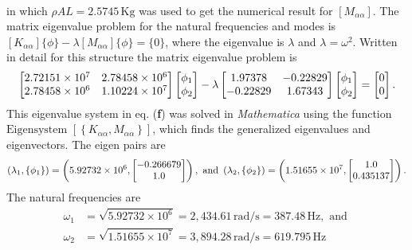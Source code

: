 \documentclass{AeroStructure-ERJohnson}
\begin{document}
\begin{example}
\begin{align}
\end{align}
in which $\rho A L=2.5745\,\mathrm{Kg}$ was used to get the numerical result for $\left[M_{\alpha \alpha}\right]$. The matrix eigenvalue problem for the natural frequencies and modes is $\left[K_{\alpha \alpha}\right]\{\phi\}-\lambda\left[M_{\alpha \alpha}\right]\{\phi\}=\{0\}$, where the eigenvalue is $\lambda$ and $\lambda=\omega^{2}$. Written in detail for this structure the matrix eigenvalue problem is
\begin{align}\label{ex18.3f}
\left[\begin{array}{@{}cc@{}}2.72151 \times 10^{7} & 2.78458 \times 10^{6} \\2.78458 \times 10^{6} & 1.10224 \times 10^{7}\end{array}\right]\left[\begin{array}{@{}l@{}}\phi_{1} \\\phi_{2}\end{array}\right]-\lambda\left[\begin{array}{@{}cc@{}}1.97378 & -0.22829 \\-0.22829 & 1.67343\end{array}\right]\left[\begin{array}{@{}l@{}}\phi_{1} \\\phi_{2}\end{array}\right]=\left[\begin{array}{@{}l@{}}0 \\0\end{array}\right].
\end{align}
This eigenvalue system in eq. (\textbf{f}) was solved in \textit{Mathematica} using the function $\text{Eigensystem }\left[\left\{K_{\alpha \alpha}, M_{\alpha \alpha}\right\}\right]$, which finds the generalized eigenvalues and eigenvectors. The eigen pairs are
\begin{align}\label{ex18.3g}
\left(\lambda_{1},\left\{\phi_{1}\right\}\right)=\left(5.92732 \times 10^{6},\left[\begin{array}{@{}c@{}}-0.266679 \\1.0\end{array}\right]\right),\text{ and }\left(\lambda_{2},\left\{\phi_{2}\right\}\right)=\left(1.51655 \times 10^{7},\left[\begin{array}{@{}c@{}}1.0 \\0.435137\end{array}\right]\right).
\end{align}
The natural frequencies are\vspace*{-5pt}
\begin{align}\label{ex18.3h}
\omega_{1} &=\sqrt{5.92732 \times 10^{6}}=2,434.61\,\mathrm{rad}/\mathrm{s}=387.48\,\mathrm{Hz},\text{ and }\nonumber\\ \omega_{2} &=\sqrt{1.51655 \times 10^{7}}=3,894.28\,\mathrm{rad}/\mathrm{s}=619.795\,\mathrm{Hz}\\[-2.3pc] \nonumber
\end{align}
\end{example}
\end{document}
